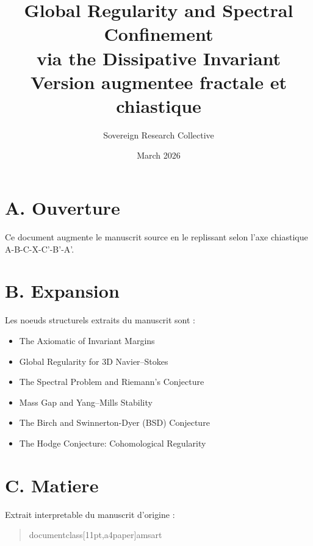 \documentclass[11pt,a4paper]{article}
\title{Global Regularity and Spectral Confinement\\ via the Dissipative Invariant \\ \large Version augmentee fractale et chiastique}
\author{Sovereign Research Collective}
\date{March 2026}
\begin{document}
\maketitle

\section*{A. Ouverture}
Ce document augmente le manuscrit source en le replissant selon l'axe chiastique A-B-C-X-C'-B'-A'.

\section*{B. Expansion}
Les noeuds structurels extraits du manuscrit sont :
\begin{itemize}[leftmargin=1.2cm]
\item The Axiomatic of Invariant Margins
\item Global Regularity for 3D Navier--Stokes
\item The Spectral Problem and Riemann's Conjecture
\item Mass Gap and Yang--Mills Stability
\item The Birch and Swinnerton-Dyer (BSD) Conjecture
\item The Hodge Conjecture: Cohomological Regularity
\end{itemize}

\section*{C. Matiere}
Extrait interpretable du manuscrit d'origine :
\begin{quote}
documentclass[11pt,a4paper]{amsart} %
\end{quote}
\end{document}

